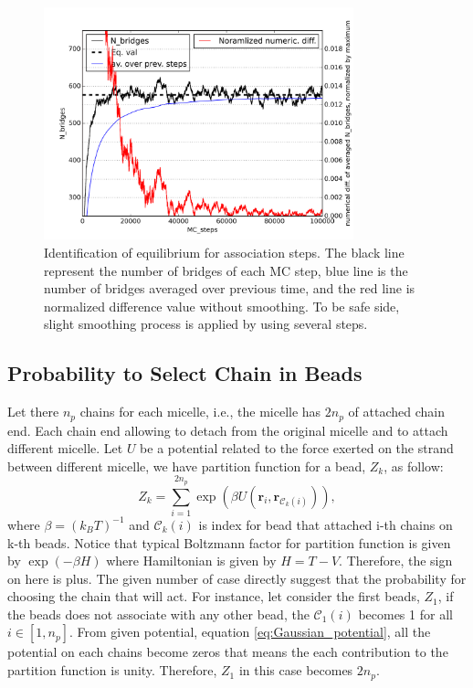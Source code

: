 \documentclass[10pt, a4paper]{report}
\begin{document}
\begin{figure}
  \centering
  \includegraphics[width=0.8\textwidth]{figures/identify_equilibrium.png}
  \caption{Identification of equilibrium for association steps. The black line represent the number of bridges of each MC step, blue line is the number of bridges averaged over previous time, and the red line is normalized difference value without smoothing. To be safe side, slight smoothing process is applied by using several steps.}
  \label{fig:identification_equilibrium_MC}
\end{figure}

\subsection{Probability to Select Chain in Beads}
Let there $n_p$ chains for each micelle, i.e., the micelle has $2n_p$ of attached chain end. Each chain end allowing to detach from the original micelle and to attach different micelle. Let $U$ be a potential related to the force exerted on the strand between different micelle, we have partition function for a bead, $Z_k$, as follow:
\begin{equation}
  Z_k = \sum_{i=1}^{2n_p}\exp\left(\beta U(\mathbf{r}_i, \mathbf{r}_{\mathscr{C}_k(i)})\right),
\end{equation}
where $\beta = (k_BT)^{-1}$ and $\mathscr{C}_k(i)$ is index for bead that attached i-th chains on k-th beads. Notice that typical Boltzmann factor for partition function is given by $\exp(-\beta H)$ where Hamiltonian is given by $H = T - V$. Therefore, the sign on here is plus.
The given number of case directly suggest that the probability for choosing the chain that will act. For instance, let consider the first beads, $Z_1$, if the beads does not associate with any other bead, the $\mathscr{C}_1(i)$ becomes 1 for all $i\in[1, n_p]$.
From given potential, equation \eqref{eq:Gaussian_potential}, all the potential on each chains become zeros that means the each contribution to the partition function is unity. Therefore, $Z_1$ in this case becomes $2n_p$.
\end{document}
